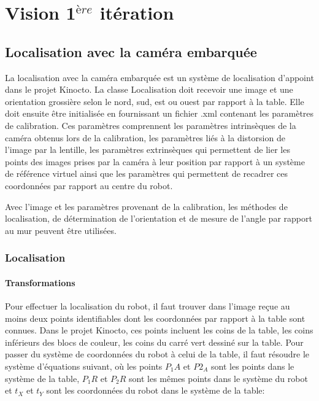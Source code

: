 


\chapter{Vision 1$^{ère}$ itération}
\label{vision1}

\section{Localisation avec la caméra embarquée}

La localisation avec la caméra embarquée est un système de localisation d'appoint dans le projet Kinocto. La classe Localisation doit recevoir une image et une orientation grossière selon le nord, sud, est ou ouest par rapport à la table. Elle doit ensuite être initialisée en fournissant un fichier .xml contenant les paramètres de calibration. Ces paramètres comprennent les paramètres intrinsèques de la caméra obtenus lors de la calibration, les paramètres liés à la distorsion de l'image par la lentille, les paramètres extrinsèques qui permettent de lier les points des images prises par la caméra à leur position par rapport à un système de référence virtuel ainsi que les paramètres qui permettent de recadrer ces coordonnées par rapport au centre du robot.

Avec l'image et les paramètres provenant de la calibration, les méthodes de localisation, de détermination de l'orientation et de mesure de l'angle par rapport au mur peuvent être utilisées.

\subsection{Localisation}

\subsubsection{Transformations}

Pour effectuer la localisation du robot, il faut trouver dans l'image reçue au moins deux points identifiables dont les coordonnées par rapport à la table sont connues. Dans le projet Kinocto, ces points incluent les coins de la table, les coins inférieurs des blocs de couleur, les coins du carré vert dessiné sur la table. Pour passer du système de coordonnées du robot à celui de la table, il faut résoudre le système d'équations suivant, où les points $P_1A$ et $P2_A$ sont les points dans le système de la table, $P_1R$ et $P_2R$ sont les mêmes points dans le système du robot et $t_X$ et $t_Y$ sont les coordonnées du robot dans le système de la table:

